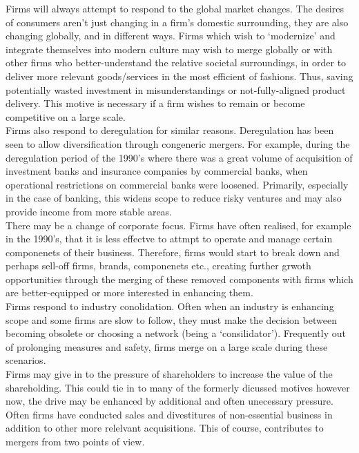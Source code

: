 \documentclass[11pt, english]{article}
\begin{document}
	Firms will always attempt to respond to the global market changes. The desires of consumers aren't just changing in a firm's domestic surrounding, they are also changing globally, and in different ways. Firms which wish to `modernize' and integrate themselves into modern culture may wish to merge globally or with other firms who better-understand the relative societal surroundings, in order to deliver more relevant goods/services in the most efficient of fashions. Thus, saving potentially wasted investment in misunderstandings or not-fully-aligned product delivery. This motive is necessary if a firm wishes to remain or become competitive on a large scale.\\

	Firms also respond to deregulation for similar reasons. Deregulation has been seen to allow diversification through congeneric mergers. For example, during the deregulation period of the 1990's where there was a great volume of acquisition of investment banks and insurance companies by commercial banks, when operational restrictions on commercial banks were loosened. Primarily, especially in the case of banking, this widens scope to reduce risky ventures and may also provide income from more stable areas.\\

	There may be a change of corporate focus. Firms have often realised, for example in the 1990's, that it is less effectve to attmpt to operate and manage certain componenets of their business. Therefore, firms would start to break down and perhaps sell-off firms, brands, componenets etc., creating further grwoth opportunities through the merging of these removed components with firms which are better-equipped or more interested in enhancing them.\\

	Firms respond to industry conolidation. Often when an industry is enhancing scope and some firms are slow to follow, they must make the decision between becoming obsolete or choosing a network (being a `consilidator'). Frequently out of prolonging measures and safety, firms merge on a large scale during these scenarios.\\

	Firms may give in to the pressure of shareholders to increase the value of the shareholding. This could tie in to many of the formerly dicussed motives however now, the drive may be enhanced by additional and often unecessary pressure. Often firms have conducted sales and divestitures of non-essential business in addition to other more relelvant acquisitions. This of course, contributes to mergers from two points of view.
\end{document}
